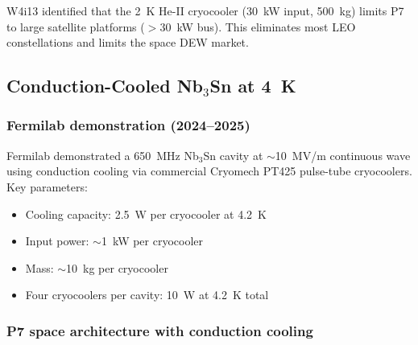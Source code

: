 \documentclass[11pt]{article}
\begin{document}
W4i13 identified that the 2~K He-II cryocooler (30~kW input, 500~kg)
limits P7 to large satellite platforms ($>$30~kW bus). This eliminates
most LEO constellations and limits the space DEW market.

\subsection{Conduction-Cooled Nb$_3$Sn at 4~K}

\subsubsection{Fermilab demonstration (2024--2025)}

Fermilab demonstrated a 650~MHz Nb$_3$Sn cavity at $\sim$10~MV/m
continuous wave using conduction cooling via commercial Cryomech
PT425 pulse-tube cryocoolers. Key parameters:
\begin{itemize}[nosep]
  \item Cooling capacity: 2.5~W per cryocooler at 4.2~K
  \item Input power: $\sim$1~kW per cryocooler
  \item Mass: $\sim$10~kg per cryocooler
  \item Four cryocoolers per cavity: 10~W at 4.2~K total
\end{itemize}

\subsubsection{P7 space architecture with conduction cooling}
\end{document}
